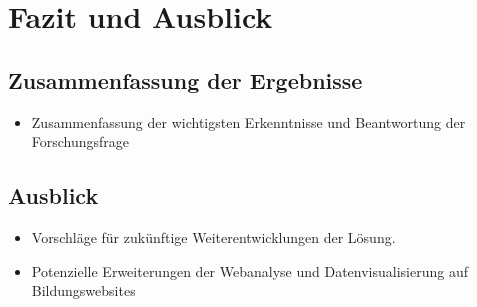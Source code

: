 

\chapter{Fazit und Ausblick}
\label{ch:zusammenfassung}

\section{Zusammenfassung der Ergebnisse}
\begin{itemize}
    \item Zusammenfassung der wichtigsten Erkenntnisse und Beantwortung der Forschungsfrage
\end{itemize}

\section{Ausblick}
\begin{itemize}
    \item Vorschläge für zukünftige Weiterentwicklungen der Lösung.
    \item Potenzielle Erweiterungen der Webanalyse und Datenvisualisierung auf Bildungswebsites
\end{itemize}




